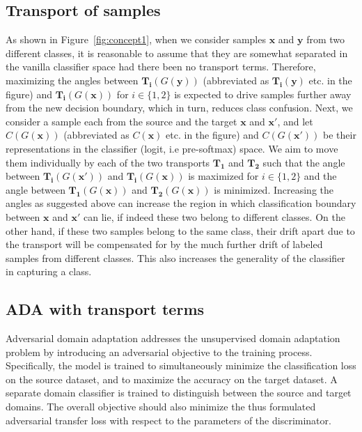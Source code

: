\documentclass[10pt,twocolumn,letterpaper]{article}
\begin{document}
\subsection{Transport of samples}

As shown in Figure~\ref{fig:concept1}, when we consider samples  $\mathbf{x}$ and $\mathbf{y}$ from two different classes, it is reasonable to assume that they are somewhat separated in the vanilla classifier space had there been no transport terms. Therefore, maximizing the angles between $\mathbf{T_i}(G(\mathbf{y}))$ (abbreviated as $\mathbf{T_i}(\mathbf{y})$ etc. in the figure) and $\mathbf{T_i}(G(\mathbf{x}))$ for $i\in\{1,2\}$ is expected to drive samples further away from the new decision boundary, which in turn, reduces class confusion. Next, we consider a sample each from the source and the target $\mathbf{x}$ and $\mathbf{x'}$, and let $C(G(\mathbf{x}))$ (abbreviated as $C(\mathbf{x})$ etc. in the figure) and $C(G(\mathbf{x'}))$ be their representations in the classifier (logit, i.e pre-softmax) space. We aim to move them individually by each of the two transports $\mathbf{T_1}$ and $\mathbf{T_2}$ such that the angle between $\mathbf{T_i}(G(\mathbf{x'}))$ and $\mathbf{T_i}(G(\mathbf{x}))$ is maximized for $i\in\{1,2\}$ and the angle between $\mathbf{T_1}(G(\mathbf{x}))$ and $\mathbf{T_2}(G(\mathbf{x}))$ is minimized. Increasing the angles as suggested above can increase the region in which classification boundary between $\mathbf{x}$ and $\mathbf{x'}$ can lie, if indeed these two belong to different classes. On the other hand, if these two samples belong to the same class, their drift apart due to the transport will be compensated for by the much further drift of labeled samples from different classes. This also increases the generality of the classifier in capturing a class.




\subsection{ADA with transport terms}
\label{sec:add}

Adversarial domain adaptation addresses the unsupervised domain adaptation problem by introducing an adversarial objective to the training process. Specifically, the model is trained to simultaneously minimize the classification loss on the source dataset, and to maximize the accuracy on the target dataset. A separate domain classifier is trained to distinguish between the source and target domains. The overall objective should also minimize the thus formulated adversarial transfer loss with respect to the parameters of the discriminator.
\end{document}
